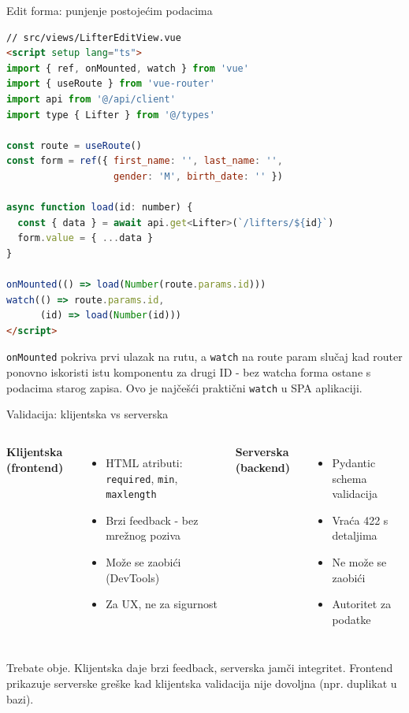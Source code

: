 \begin{frame}[fragile,shrink=5]{Edit forma: punjenje postojećim podacima}
\begin{lstlisting}[language=html]
// src/views/LifterEditView.vue
<script setup lang="ts">
import { ref, onMounted, watch } from 'vue'
import { useRoute } from 'vue-router'
import api from '@/api/client'
import type { Lifter } from '@/types'

const route = useRoute()
const form = ref({ first_name: '', last_name: '',
                   gender: 'M', birth_date: '' })

async function load(id: number) {
  const { data } = await api.get<Lifter>(`/lifters/${id}`)
  form.value = { ...data }
}

onMounted(() => load(Number(route.params.id)))
watch(() => route.params.id,
      (id) => load(Number(id)))
</script>
\end{lstlisting}

\vspace{0.4em}
\texttt{onMounted} pokriva prvi ulazak na rutu, a \texttt{watch} na route param slučaj kad router ponovno iskoristi istu komponentu za drugi ID - bez watcha forma ostane s podacima starog zapisa. Ovo je najčešći praktični \texttt{watch} u SPA aplikaciji.
\end{frame}

\begin{frame}{Validacija: klijentska vs serverska}
\begin{columns}[T]
\textbf{Klijentska (frontend)}
\begin{itemize}
  \item HTML atributi: \texttt{required}, \texttt{min}, \texttt{maxlength}
  \item Brzi feedback - bez mrežnog poziva
  \item Može se zaobići (DevTools)
  \item Za UX, ne za sigurnost
\end{itemize}

\textbf{Serverska (backend)}
\begin{itemize}
  \item Pydantic schema validacija
  \item Vraća 422 s detaljima
  \item Ne može se zaobići
  \item Autoritet za podatke
\end{itemize}
\end{columns}

\vspace{0.6em}
Trebate obje. Klijentska daje brzi feedback, serverska jamči integritet. Frontend prikazuje serverske greške kad klijentska validacija nije dovoljna (npr. duplikat u bazi).
\end{frame}

